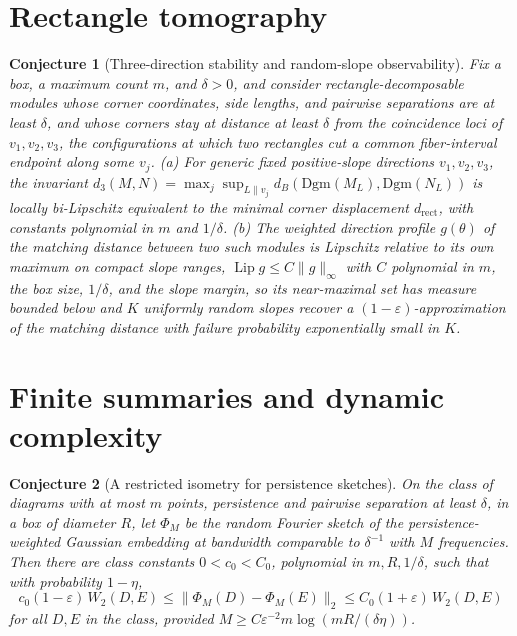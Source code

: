 \documentclass[11pt]{article}
\newtheorem{conjecture}{Conjecture}
\theoremstyle{definition}
\newcommand{\eps}{\varepsilon}
\begin{document}
\section{Rectangle tomography}

\begin{conjecture}[Three-direction stability and random-slope observability]\label{ai8}
Fix a box, a maximum count $m$, and $\delta>0$, and consider rectangle-decomposable modules whose corner coordinates, side lengths, and pairwise separations are at least $\delta$, and whose corners stay at distance at least $\delta$ from the coincidence loci of $v_1,v_2,v_3$, the configurations at which two rectangles cut a common fiber-interval endpoint along some $v_j$.  (a) For generic fixed positive-slope directions $v_1,v_2,v_3$, the invariant $d_3(M,N)=\max_j\sup_{L\parallel v_j}d_B(\mathrm{Dgm}(M_L),\mathrm{Dgm}(N_L))$ is locally bi-Lipschitz equivalent to the minimal corner displacement $d_{\mathrm{rect}}$, with constants polynomial in $m$ and $1/\delta$.  (b) The weighted direction profile $g(\theta)$ of the matching distance between two such modules is Lipschitz relative to its own maximum on compact slope ranges, $\operatorname{Lip}g\le C\lVert g\rVert_\infty$ with $C$ polynomial in $m$, the box size, $1/\delta$, and the slope margin, so its near-maximal set has measure bounded below and $K$ uniformly random slopes recover a $(1-\eps)$-approximation of the matching distance with failure probability exponentially small in $K$.
\end{conjecture}

\section{Finite summaries and dynamic complexity}

\begin{conjecture}[A restricted isometry for persistence sketches]\label{ai9}
On the class of diagrams with at most $m$ points, persistence and pairwise separation at least $\delta$, in a box of diameter $R$, let $\Phi_M$ be the random Fourier sketch of the persistence-weighted Gaussian embedding at bandwidth comparable to $\delta^{-1}$ with $M$ frequencies.  Then there are class constants $0<c_0<C_0$, polynomial in $m,R,1/\delta$, such that with probability $1-\eta$,
\[
c_0(1-\eps)\,W_2(D,E)\le\lVert\Phi_M(D)-\Phi_M(E)\rVert_2\le C_0(1+\eps)\,W_2(D,E)
\]
for all $D,E$ in the class, provided $M\ge C\eps^{-2}m\log(mR/(\delta\eta))$.
\end{conjecture}
\end{document}

